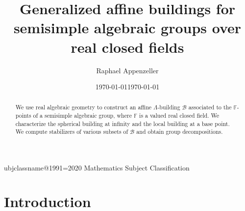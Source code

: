 \documentclass[12pt]{amsart}
\title[Affine buildings for algebraic groups over real closed fields]{Generalized affine buildings for semisimple algebraic groups over real closed fields}
\author{Raphael Appenzeller}
\date{\today}      %
\newcommand{\F}{\mathbb{F} }
\newcommand{\B}{\mathcal{B}}
\numberwithin{equation}{section}
\theoremstyle{remark} %
\begin{document}
\def\subjclassname{\textup{2020} Mathematics Subject Classification}
\expandafter\let\csname subjclassname@1991\endcsname=\subjclassname
{}
\date{\today}


\begin{abstract}
	We use real algebraic geometry to construct an affine $\Lambda$-building $\B$ associated to the $\F$-points of a semisimple algebraic group, where $\F$ is a valued real closed field. We characterize the spherical building at infinity and the local building at a base point. We compute stabilizers of various subsets of $\B$ and obtain group decompositions. 
\end{abstract}




\maketitle

	
\section{Introduction}
\end{document}
